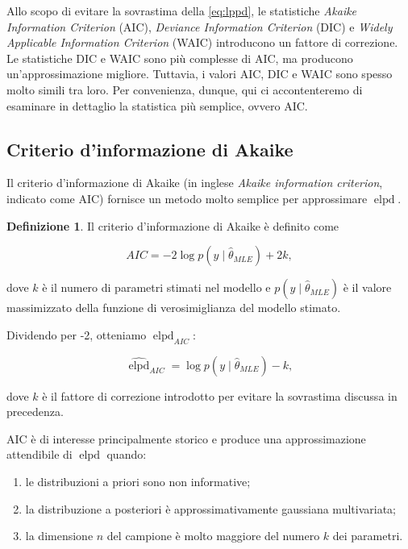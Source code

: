 \documentclass[
  11pt,
]{krantz}
\providecommand{\tightlist}{%
  \setlength{\itemsep}{0pt}\setlength{\parskip}{0pt}}
\DeclareMathOperator{\elpd}{elpd} %
\theoremstyle{definition}
\newtheorem{definition}{Definizione}[chapter]
\theoremstyle{definition}
\theoremstyle{definition}
\theoremstyle{definition}
\theoremstyle{remark}
\begin{document}
Allo scopo di evitare la sovrastima della \eqref{eq:lppd}, le statistiche \emph{Akaike Information Criterion} (AIC), \emph{Deviance Information Criterion} (DIC) e \emph{Widely Applicable Information Criterion} (WAIC) introducono un fattore di correzione. Le statistiche DIC e WAIC sono più complesse di AIC, ma producono un'approssimazione migliore. Tuttavia, i valori AIC, DIC e WAIC sono spesso molto simili tra loro. Per convenienza, dunque, qui ci accontenteremo di esaminare in dettaglio la statistica più semplice, ovvero AIC.

\hypertarget{criterio-dinformazione-di-akaike}{%
\subsection{Criterio d'informazione di Akaike}\label{criterio-dinformazione-di-akaike}}

Il criterio d'informazione di Akaike (in inglese \emph{Akaike information criterion}, indicato come AIC) fornisce un metodo molto semplice per approssimare \(\elpd\).

\begin{definition}
Il criterio d'informazione di Akaike è definito come

\begin{equation}
AIC = -2 \log p(y \mid \hat{\theta}_{MLE}) + 2k,
\end{equation}

dove \(k\) è il numero di parametri stimati nel modello e \(p(y \mid \hat{\theta}_{MLE})\) è il valore massimizzato della funzione di verosimiglianza del modello stimato.
\end{definition}

Dividendo per -2, otteniamo \(\elpd_{AIC}\):

\begin{equation}
\widehat{\elpd}_{AIC} = \log p(y \mid \hat{\theta}_{MLE}) - k,
\end{equation}

dove \(k\) è il fattore di correzione introdotto per evitare la sovrastima discussa in precedenza.

AIC è di interesse principalmente storico e produce una approssimazione attendibile di \(\elpd\) quando:

\begin{enumerate}
\def\labelenumi{\arabic{enumi}.}
\tightlist
\item
  le distribuzioni a priori sono non informative;
\item
  la distribuzione a posteriori è approssimativamente gaussiana multivariata;
\item
  la dimensione \(n\) del campione è molto maggiore del numero \(k\) dei parametri.
\end{enumerate}
\end{document}

